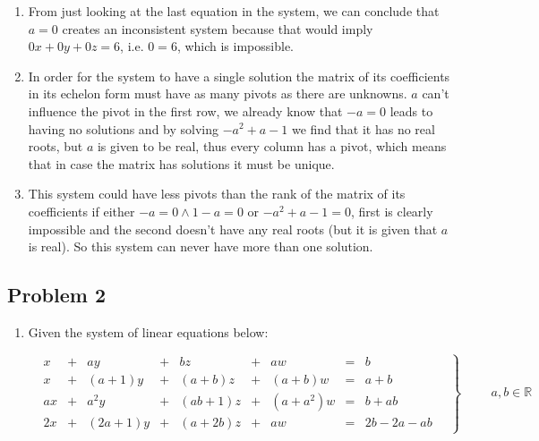 \documentclass[11pt]{article}
\begin{document}
\begin{enumerate}
\item From just looking at the last equation in the system, we can conclude
that $a=0$ creates an inconsistent system because that would imply
$0x+0y+0z=6$, i.e. $0=6$, which is impossible.

\item In order for the system to have a single solution the matrix of its
coefficients in its echelon form must have as many pivots as there are
unknowns.  $a$ can't influence the pivot in the first row, we already
know that $-a=0$ leads to having no solutions and by solving $-a^2+a-1$
we find that it has no real roots, but $a$ is given to be real, thus
every column has a pivot, which means that in case the matrix has
solutions it must be unique.

\item This system could have less pivots than the rank of the matrix of its
coefficients if either $-a=0 \land 1-a=0$ or $-a^2+a-1=0$, first is
clearly impossible and the second doesn't have any real roots (but it
is given that $a$ is real). So this system can never have more than
one solution.
\end{enumerate}
\subsection{Problem 2}
\label{sec-1-2}

\begin{enumerate}
\item Given the system of linear equations below:

\begin{equation*}
  \left.
    \begin{alignedat}{5}
      &  x & {}+{} & ay        & {}+{} & bz        & {}+{} & aw         & {}={} & b \\
      &  x & {}+{} & (a + 1)y  & {}+{} & (a + b)z  & {}+{} & (a + b)w   & {}={} & a + b \\
      & ax & {}+{} & a^2y      & {}+{} & (ab + 1)z & {}+{} & (a + a^2)w & {}={} & b + ab \\
      & 2x & {}+{} & (2a + 1)y & {}+{} & (a + 2b)z & {}+{} & aw         & {}={} & 2b - 2a - ab
    \end{alignedat}
  \quad \right\} \qquad
  \begin{aligned}
    a, b \in \mathbb{R}
  \end{aligned}
\end{equation*}
\end{enumerate}
\end{document}
